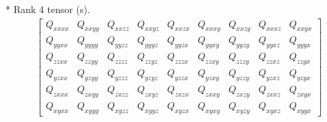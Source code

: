 \documentclass[fleqn,8pt,landscape]{jsarticle}
\begin{document}
* Rank 4 tensor (s).
\begin{align*}
\begin{bmatrix} Q_{xxxx} & Q_{xxyy} & Q_{xxzz} & Q_{xxyz} & Q_{xxzx} & Q_{xxxy} & Q_{xxzy} & Q_{xxxz} & Q_{xxyx} \\ Q_{yyxx} & Q_{yyyy} & Q_{yyzz} & Q_{yyyz} & Q_{yyzx} & Q_{yyxy} & Q_{yyzy} & Q_{yyxz} & Q_{yyyx} \\ Q_{zzxx} & Q_{zzyy} & Q_{zzzz} & Q_{zzyz} & Q_{zzzx} & Q_{zzxy} & Q_{zzzy} & Q_{zzxz} & Q_{zzyx} \\ Q_{yzxx} & Q_{yzyy} & Q_{yzzz} & Q_{yzyz} & Q_{yzzx} & Q_{yzxy} & Q_{yzzy} & Q_{yzxz} & Q_{yzyx} \\ Q_{zxxx} & Q_{zxyy} & Q_{zxzz} & Q_{zxyz} & Q_{zxzx} & Q_{zxxy} & Q_{zxzy} & Q_{zxxz} & Q_{zxyx} \\ Q_{xyxx} & Q_{xyyy} & Q_{xyzz} & Q_{xyyz} & Q_{xyzx} & Q_{xyxy} & Q_{xyzy} & Q_{xyxz} & Q_{xyyx} \end{bmatrix}
\end{align*}
\end{document}
